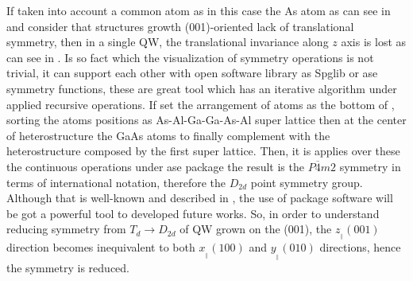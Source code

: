 If taken into account a common atom as in this case the As atom as can see in 
 and consider that structures growth (001)-oriented lack of translational symmetry\cite{ivchenko1996heavylight}, then in a single \gls{QW}, the translational invariance along $z$ axis is lost\cite{tronc2000bound} as can see in . Is so fact which the visualization of symmetry operations is not trivial, it can support each other with  open software library as \gls{Spglib} or \gls{ase}  symmetry functions, these are great tool which has an iterative algorithm under applied recursive operations. If set the arrangement of atoms as the bottom of , sorting the atoms positions as As-Al-Ga-Ga-As-Al super lattice then at the center of heterostructure the GaAs atoms to finally complement with the heterostructure composed by the first super lattice. Then, it is applies over these the continuous operations under \gls{ase} package the result is the $P\overline{4}m2$ symmetry in terms of international notation, therefore the $D_{2d}$ point symmetry group. 
Although that is well-known and described in \cite{tronc2000bound,ivchenko1996heavylight,glazov2018electron,krebs1996giant,magri2000anticrossing,chen2002interface,ivchenko2008spinphoto}, the use of package software will be got a powerful tool to developed future works. So, in order to understand reducing symmetry from $T_{d}\to D_{2d}$ of QW grown on the (001), the $z_{_{\parallel}}(001)$ direction becomes inequivalent to both $x_{_{\parallel}}(100)$ and $y_{_{\parallel}}(010)$ directions, hence the symmetry is reduced. 

